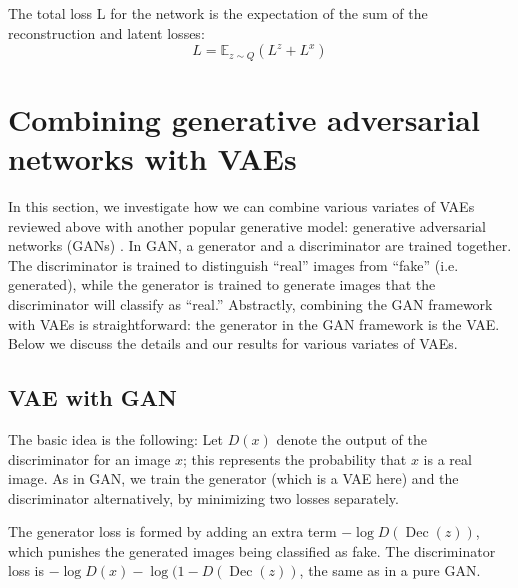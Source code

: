 \documentclass[10pt]{article}
\newcommand{\op}[1]{\operatorname{#1}}
\newcommand{\E}{\mathbb{E}}
\begin{document}
The total loss L for the network is the expectation of the sum of the reconstruction and latent losses:
$$L = \E_{z \sim Q} (L^z + L^x)$$







\section{Combining generative adversarial networks with VAEs}

In this section, we investigate how we can combine various variates of VAEs reviewed above with another popular generative model: generative adversarial networks (GANs) \cite{goodfellow2014gan}. In GAN, a generator and a discriminator are trained together. The discriminator is trained to distinguish ``real'' images from ``fake'' (i.e. generated), while the generator is trained to generate images that the discriminator will classify as ``real.'' Abstractly, combining the GAN framework with VAEs is straightforward: the generator in the GAN framework is the VAE. Below we discuss the details and our results for various variates of VAEs. 

\subsection{VAE with GAN}
The basic idea is the following: Let $D(x)$ denote the output of the discriminator for an image $x$; this represents the probability that $x$ is a real image. As in GAN, we train the generator (which is a VAE here) and the discriminator alternatively, by minimizing two losses separately. 

The generator loss is formed by adding an extra term $-\log D(\op{Dec}(z))$, which punishes the generated images being classified as fake. The discriminator loss is $-\log D(x) - \log (1-D(\op{Dec}(z))$, the same as in a pure GAN. 
\end{document}
